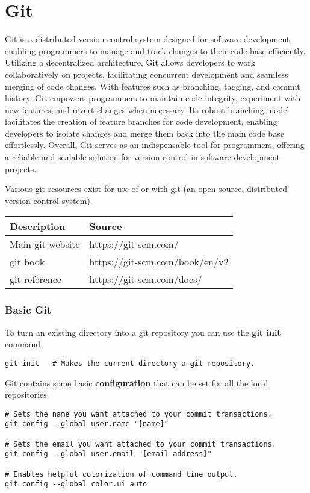 \chapter{Git}
\thispagestyle{fancy}
\lstset{language=bash, style=gitstyle}

Git is a distributed version control system designed for software development, enabling programmers to manage and track changes to their code base efficiently. Utilizing a decentralized architecture, Git allows developers to work collaboratively on projects, facilitating concurrent development and seamless merging of code changes. With features such as branching, tagging, and commit history, Git empowers programmers to maintain code integrity, experiment with new features, and revert changes when necessary. Its robust branching model facilitates the creation of feature branches for code development, enabling developers to isolate changes and merge them back into the main code base effortlessly. Overall, Git serves as an indispensable tool for programmers, offering a reliable and scalable solution for version control in software development projects.

\begin{fancybox}{}	
	Various git resources exist for use of or with git (an open source, distributed version-control system).
	\begin{center}
		\begin{tabular}{l|l}
			Description & Source \\
			\hline
			Main git website & https://git-scm.com/ \\
			git book & https://git-scm.com/book/en/v2 \\
			git reference & https://git-scm.com/docs/
		\end{tabular}
	\end{center}
\end{fancybox}

\subsection{Basic Git}

To turn an existing directory into a git repository you can use the \textbf{git init} command,
\begin{lstlisting}
git init   # Makes the current directory a git repository.
\end{lstlisting}

Git contains some basic \textbf{configuration} that can be set for all the local repositories.
\begin{lstlisting}
# Sets the name you want attached to your commit transactions.
git config --global user.name "[name]"

# Sets the email you want attached to your commit transactions.
git config --global user.email "[email address]"

# Enables helpful colorization of command line output.
git config --global color.ui auto
\end{lstlisting}

